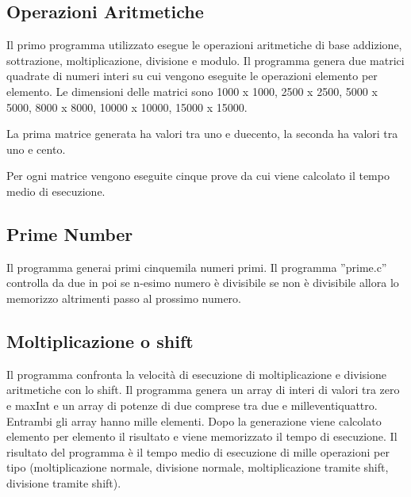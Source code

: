 \documentclass[12pt,a4paper]{report}
\begin{document}

\subsection{Operazioni Aritmetiche}
Il primo programma utilizzato esegue le operazioni aritmetiche di base addizione, sottrazione, moltiplicazione, divisione e modulo.
Il programma genera due matrici quadrate di numeri interi su cui vengono eseguite le operazioni elemento per elemento. Le dimensioni delle matrici sono 1000 x 1000, 2500 x 2500, 5000 x 5000, 8000 x 8000, 10000 x 10000, 15000 x 15000.

La prima matrice generata ha valori tra uno e duecento, la seconda ha valori tra uno e cento.

Per ogni matrice vengono eseguite cinque prove da cui viene calcolato il tempo medio di esecuzione.

\subsection{Prime Number}
Il programma generai primi cinquemila numeri primi. 
Il programma ''prime.c'' controlla da due in poi se n-esimo numero è divisibile se non è divisibile allora lo memorizzo altrimenti passo al prossimo numero.  

\subsection{Moltiplicazione o shift}
Il programma confronta la velocità di esecuzione di moltiplicazione e divisione aritmetiche con lo shift. Il programma genera un array di interi di valori tra zero e maxInt e un array di potenze di due comprese tra due e milleventiquattro. Entrambi gli array hanno mille elementi. Dopo la generazione viene calcolato elemento per elemento il risultato e viene memorizzato il tempo di esecuzione. Il risultato del programma è il tempo medio di esecuzione di mille operazioni per tipo (moltiplicazione normale, divisione normale, moltiplicazione tramite shift, divisione tramite shift).
\end{document}
